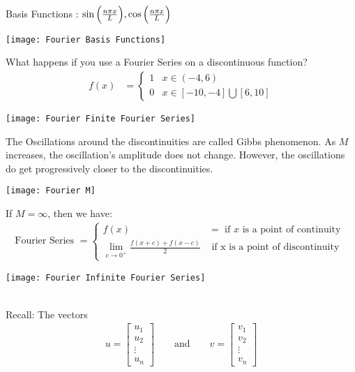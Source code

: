   Basis Functions : $\sin \Big( \frac{n \pi x}{L} \Big), \cos \Big( \frac{n \pi x}{L} \Big)$
  \begin{center}
    \texttt{[image: Fourier Basis Functions]}
  \end{center}

  What happens if you use a Fourier Series on a discontinuous function?
  \begin{align}
    f(x) & =
    \begin{cases}
      1 & x \in (-4, 6)\\
      0 & x \in [-10, -4] \bigcup [6, 10]
    \end{cases}
  \end{align}

  \begin{center}
    \texttt{[image: Fourier Finite Fourier Series]}
  \end{center}

  The Oscillations around the discontinuities are called Gibbs phenomenon. As $M$ increases, the oscillation's amplitude does not change. However, the oscillations do get progressively closer to the discontinuities.

  \begin{center}
    \texttt{[image: Fourier M]}
  \end{center}

  If $M = \infty$, then we have:
  \begin{align}
    \text{Fourier Series } =
    \begin{cases}
      f(x) & = \text{ if $x$ is a point of continuity }\\
      \lim_{c \to 0^+} \frac{f(x + c) + f(x - c)}{2} & \text{ if x is a point of discontinuity}
    \end{cases}
  \end{align}

  \begin{center}
    \texttt{[image: Fourier Infinite Fourier Series]}
  \end{center}

  \\
  Recall: The vectors
  \begin{align}
    u =
    \begin{bmatrix}
      u_1\\
      u_2\\
      \vdots\\
      u_n
    \end{bmatrix}
    \qquad \text{and} \qquad
    v =
    \begin{bmatrix}
      v_1\\
      v_2\\
      \vdots\\
      v_n
    \end{bmatrix}
  \end{align}

